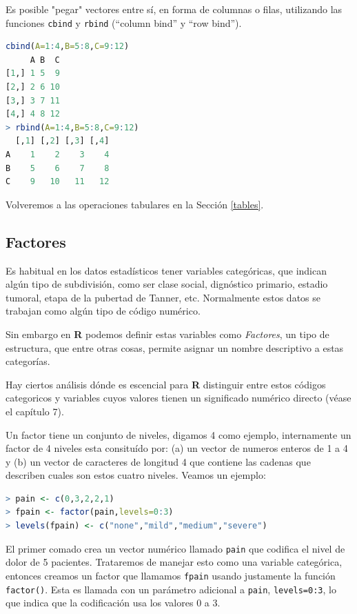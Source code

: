 \documentclass[spanish]{extbook}
\numberwithin{equation}{section}
\numberwithin{figure}{section}
\begin{document}
Es posible "pegar" vectores entre sí, en forma de columnas o filas, utilizando
las funciones \texttt{cbind} y \texttt{rbind} (``column bind'' y ``row bind'').

\begin{lstlisting}[language=R]
cbind(A=1:4,B=5:8,C=9:12)
     A B  C
[1,] 1 5  9
[2,] 2 6 10
[3,] 3 7 11
[4,] 4 8 12
> rbind(A=1:4,B=5:8,C=9:12)
  [,1] [,2] [,3] [,4]
A    1    2    3    4
B    5    6    7    8
C    9   10   11   12
\end{lstlisting}

Volveremos a las operaciones tabulares en la Sección \ref{tables}.

\subsection{Factores}

Es habitual en los datos estadísticos tener variables categóricas, que indican
algún tipo de subdivisión, como ser clase social, dignóstico primario, estadio
tumoral, etapa de la pubertad de Tanner, etc. Normalmente estos datos se
trabajan como algún tipo de código numérico. 

Sin embargo en \textbf{R} podemos definir estas variables como
\textit{Factores}, un tipo de estructura, que entre otras cosas, permite
asignar un nombre descriptivo a estas categorías.  

Hay ciertos análisis dónde es escencial para \textbf{R} distinguir
entre estos códigos categoricos y variables cuyos valores tienen un significado
numérico directo (véase el capítulo 7). 

Un factor tiene un conjunto de niveles, digamos 4 como ejemplo, internamente un
factor de 4 niveles esta consituído por: (a) un vector de numeros enteros de 1
a 4 y (b) un vector de caracteres de longitud 4 que contiene las cadenas que
describen cuales son estos cuatro niveles. Veamos un ejemplo:

\begin{lstlisting}[language=R]
> pain <- c(0,3,2,2,1)
> fpain <- factor(pain,levels=0:3)
> levels(fpain) <- c("none","mild","medium","severe")
\end{lstlisting}

El primer comado crea un vector numérico llamado \texttt{pain} que codifica el
nivel de dolor de 5 pacientes. Trataremos de manejar esto como una variable
categórica, entonces creamos un factor que llamamos \texttt{fpain} usando justamente la
función \texttt{factor()}. Esta es llamada con un parámetro adicional a \texttt{pain},
\texttt{levels=0:3}, lo que indica que la codificación usa los valores 0 a 3.
\end{document}
